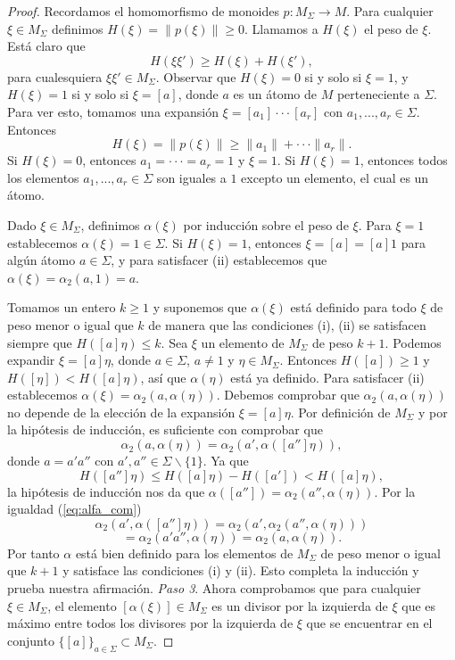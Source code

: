 \documentclass[12pt]{book}
\theoremstyle{definition}
\providecommand{\norm}[1]{\lVert#1\rVert}
\begin{document}
\begin{proof}
Recordamos el homomorfismo de monoides $p:M_\Sigma\rightarrow M$. Para cualquier $\xi\in M_\Sigma$ definimos $H(\xi)=\norm{p(\xi)}\geq 0$. Llamamos a $H(\xi)$ el peso de $\xi$. Está claro que
$$H(\xi\xi')\geq H(\xi)+H(\xi'),$$
para cualesquiera $\xi\xi'\in M_\Sigma$. Observar que $H(\xi)=0$ si y solo si $\xi=1$, y $H(\xi)=1$ si y solo si $\xi=[a]$, donde $a$ es un átomo de $M$ perteneciente a $\Sigma$. Para ver esto, tomamos una expansión $\xi=[a_1]\cdot\cdot\cdot[a_r]$ con $a_1,...,a_r\in\Sigma$. Entonces
$$H(\xi)=\norm{p(\xi)}\geq\norm{a_1}+\cdot\cdot\cdot\norm{a_r}.$$
Si $H(\xi)=0$, entonces $a_1=\cdot\cdot\cdot=a_r=1$ y $\xi=1$. Si $H(\xi)=1$, entonces todos los elementos $a_1,...,a_r\in\Sigma$ son iguales a $1$ excepto un elemento, el cual es un átomo.

Dado $\xi\in M_\Sigma$, definimos $\alpha(\xi)$ por inducción sobre el peso de $\xi$. Para $\xi=1$ establecemos $\alpha(\xi)=1\in\Sigma$. Si $H(\xi)=1$, entonces $\xi=[a]=[a]1$ para algún átomo $a\in\Sigma$, y para satisfacer (ii) establecemos que $\alpha(\xi)=\alpha_2(a,1)=a$.

Tomamos un entero $k\geq 1$ y suponemos que $\alpha(\xi)$ está definido para todo $\xi$ de peso menor o igual que $k$ de manera que las condiciones (i), (ii) se satisfacen siempre que $H([a]\eta)\leq k$. Sea $\xi$ un elemento de $M_\Sigma$ de peso $k+1$. Podemos expandir $\xi=[a]\eta$, donde $a\in\Sigma$, $a\neq 1$ y $\eta\in M_\Sigma$. Entonces $H([a])\geq 1$ y $H([\eta]) < H([a]\eta)$, así que $\alpha(\eta)$ está ya definido. Para satisfacer (ii) establecemos $\alpha(\xi)=\alpha_2(a,\alpha(\eta))$. Debemos comprobar que $\alpha_2(a,\alpha(\eta))$ no depende de la elección de la expansión $\xi=[a]\eta$. Por definición de $M_\Sigma$ y por la hipótesis de inducción, es suficiente con comprobar que 
$$\alpha_2(a,\alpha(\eta))=\alpha_2(a',\alpha([a'']\eta)),$$
donde $a=a'a''$ con $a',a''\in \Sigma \backslash\{1\}$. Ya que
$$H([a'']\eta)\leq H([a]\eta) - H([a'])<H([a]\eta),$$
la hipótesis de inducción nos da que $\alpha([a''])=\alpha_2(a'',\alpha(\eta))$. Por la igualdad (\ref{eq:alfa_com}) 
$$\alpha_2(a',\alpha([a'']\eta))=\alpha_2(a',\alpha_2(a'',\alpha(\eta)))$$
$$=\alpha_2(a'a'',\alpha(\eta))=\alpha_2(a,\alpha(\eta)).$$
Por tanto $\alpha$ está bien definido para los elementos de $M_\Sigma$ de peso menor o igual que $k +1$ y satisface las condiciones (i) y (ii). Esto completa la inducción y prueba nuestra afirmación.
\newline
\newline
\textit{Paso 3}. Ahora comprobamos que para cualquier $\xi\in M_\Sigma$, el elemento $[\alpha(\xi)]\in M_\Sigma$ es un divisor por la izquierda de $\xi$ que es máximo entre todos los divisores por la izquierda de $\xi$ que se encuentrar en el conjunto $\{[a]\}_{a\in\Sigma}\subset M_\Sigma$.


\end{proof}
\end{document}
